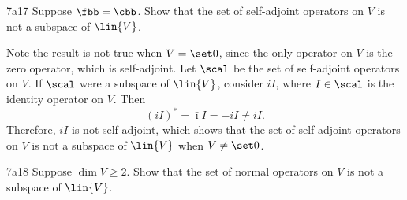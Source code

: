 \begin{exercise}{7a17}
    Suppose $\fbb = \cbb$.
    Show that the set of self-adjoint operators on $V$ is not a subspace of $\lin{V}$.
\end{exercise}

\begin{sol}
    Note the result is not true when $V = \set 0$, since the only operator on $V$ is the zero operator, which is self-adjoint.
    Let $\scal$ be the set of self-adjoint operators on $V$.
    If $\scal$ were a subspace of $\lin{V}$, consider $iI$, where $I \in \scal$ is the identity operator on $V$.
    Then
    \[
        (iI)^\ast = \bar\imath I = -iI \neq iI.
    \]
    Therefore, $iI$ is not self-adjoint, which shows that the set of self-adjoint operators on $V$ is not a subspace of $\lin{V}$ when $V \neq \set 0$.
\end{sol}

\begin{exercise}{7a18}
    Suppose $\dim V \geq 2$.
    Show that the set of normal operators on $V$ is not a subspace of $\lin{V}$.
\end{exercise}

